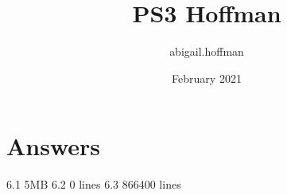 \documentclass{article}
\title{PS3 Hoffman}
\author{abigail.hoffman }
\date{February 2021}
\begin{document}
\maketitle

\section{Answers}

6.1 5MB
6.2 0 lines
6.3 866400 lines
\end{document}
